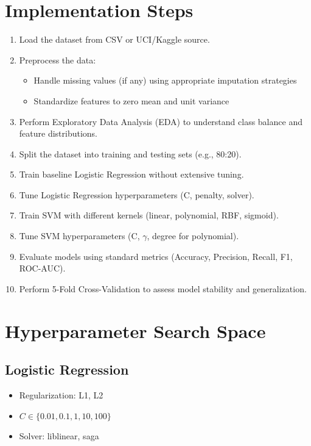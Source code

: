 \documentclass[11pt]{article}
\begin{document}
\section*{Implementation Steps}
\begin{enumerate}[label=\arabic*.]
\item Load the dataset from CSV or UCI/Kaggle source.
\item Preprocess the data:
\begin{itemize}
\item Handle missing values (if any) using appropriate imputation strategies
\item Standardize features to zero mean and unit variance
\end{itemize}
\item Perform Exploratory Data Analysis (EDA) to understand class balance and feature distributions.
\item Split the dataset into training and testing sets (e.g., 80:20).
\item Train baseline Logistic Regression without extensive tuning.
\item Tune Logistic Regression hyperparameters (C, penalty, solver).
\item Train SVM with different kernels (linear, polynomial, RBF, sigmoid).
\item Tune SVM hyperparameters (C, $\gamma$, degree for polynomial).
\item Evaluate models using standard metrics (Accuracy, Precision, Recall, F1, ROC-AUC).
\item Perform 5-Fold Cross-Validation to assess model stability and generalization.
\end{enumerate}

\section*{Hyperparameter Search Space}

\subsection*{Logistic Regression}
\begin{itemize}
\item Regularization: L1, L2
\item $C \in \{0.01, 0.1, 1, 10, 100\}$
\item Solver: liblinear, saga
\end{itemize}
\end{document}
